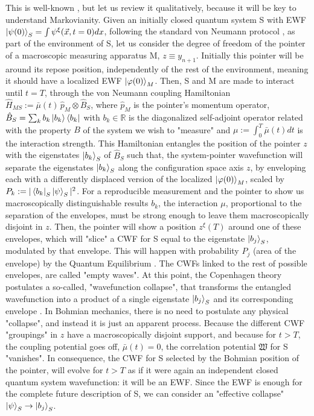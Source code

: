 \documentclass[11pt, a4paper]{article} %
\newcommand{\R}{\mathbb{R}} %
\begin{document}
This is well-known \cite{Durr, Absolute, operatorsObservables}, but let us review it qualitatively, because it will be key to understand Markovianity. Given an initially closed quantum system S with EWF $\ket{\psi(0)}_S=\int\psi^\xi(\vec{x},t=0)dx$, following the standard von Neumann protocol \cite{vonNeumann}, as part of the environment of S, let us consider the degree of freedom of the pointer of a macroscopic measuring apparatus M, $z\equiv y_{n+1}$. Initially this pointer will be around its repose position, independently of the rest of the environment, meaning it should have a localized EWF $\ket{\varphi(0)}_M$. Then, S and M are made to interact until $t=T$, through the von Neumann coupling Hamiltonian $\hat{H}_{MS}:=\bar{\mu}(t)\,\hat{p}_M\otimes \hat{B}_S$, where $\hat{p}_M$ is the pointer's momentum operator, $\hat{B}_S=\sum_kb_k\ket{b_k}\bra{b_k}$ with $b_k\in\R$ is the diagonalized self-adjoint operator related with the property $B$ of the system we wish to "measure" and $\mu:=\int_0^T\bar{\mu}(t)dt$ is the interaction strength. This Hamiltonian entangles the position of the pointer $z$ with the eigenstates $\ket{b_k}_S$ of $\hat{B}_S$ such that, the system-pointer wavefunction will separate the eigenstates $\ket{b_k}_S$ along the configuration space axis $z$, by enveloping each with a differently displaced version of the localized $\ket{\varphi(0)}_M$, scaled by $P_k:=|\bra{b_k}_S\ket{\psi}_S|^2$. For a reproducible measurement \cite{operatorsObservables} and the pointer to show us macroscopically distinguishable results $b_k$, the interaction $\mu$, proportional to the separation of the envelopes, must be strong enough to leave them macroscopically disjoint in $z$. Then, the pointer will show a position $z^\xi(T)$ around one of these envelopes, which will "slice" a CWF for S equal to the eigenstate $\ket{b_j}_S$, modulated by that envelope. This will happen with probability $P_j$ (area of the envelope) by the Quantum Equilibrium \cite{Absolute}. The CWFs linked to the rest of possible envelopes, are called "empty waves". At this point, the Copenhagen theory postulates a so-called, "wavefunction collapse", that transforms the entangled wavefunction into a product of a single eigenstate $\ket{b_j}_S$ and its corresponding envelope \cite{vonNeumann}. In Bohmian mechanics, there is no need to postulate any physical "collapse", and instead it is just an apparent process. Because the different CWF "groupings" in $z$ have a macroscopically disjoint support, and because for $t>T$, the coupling potential goes off, $\bar{\mu}(t)=0$, the correlation potential $\mathfrak{W}$ for S "vanishes". In consequence, the CWF for S selected by the Bohmian position of the pointer, will evolve for $t>T$ as if it were again an independent closed quantum system wavefunction: it will be an EWF. Since the EWF is enough for the complete future description of S, we can consider an "effective collapse" $\ket{\psi}_S\rightarrow\ket{b_j}_S$.
\end{document}
